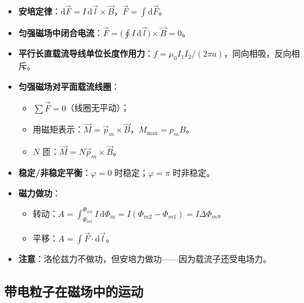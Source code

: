 \documentclass[12pt,a4paper]{ctexart}
\begin{document}
\begin{itemize}
    \item \textbf{安培定律}：$\mathrm d\vec F=I\,\mathrm d\vec l\times\vec B$，$\vec F=\displaystyle\int\mathrm d\vec F$。
    \item \textbf{匀强磁场中闭合电流}：$\vec F=\bigl(\displaystyle\oint I\,\mathrm d\vec l\bigr)\times\vec B=0$。
    \item \textbf{平行长直载流导线单位长度作用力}：$f=\mu_0 I_1 I_2/(2\pi a)$，同向相吸，反向相斥。
    \item \textbf{匀强磁场对平面载流线圈}：
    \begin{itemize}
        \item $\sum\vec F=0$（线圈无平动）；
        \item 用磁矩表示：$\vec M=\vec p_m\times\vec B$，$M_{\max}=p_m B$。
        \item $N$ 匝：$\vec M=N\vec p_m\times\vec B$。
    \end{itemize}
    \item \textbf{稳定/非稳定平衡}：$\varphi=0$ 时稳定；$\varphi=\pi$ 时非稳定。
    \item \textbf{磁力做功}：
    \begin{itemize}
        \item 转动：$A=\displaystyle\int_{\Phi_{m1}}^{\Phi_{m2}}I\,\mathrm d\Phi_m=I(\Phi_{m2}-\Phi_{m1})=I\Delta\Phi_m$。
        \item 平移：$A=\displaystyle\int\vec F\cdot\mathrm d\vec l$。
    \end{itemize}
    \item \textbf{注意}：洛伦兹力不做功，但安培力做功——因为载流子还受电场力。
\end{itemize}

\subsection{带电粒子在磁场中的运动}
\end{document}
